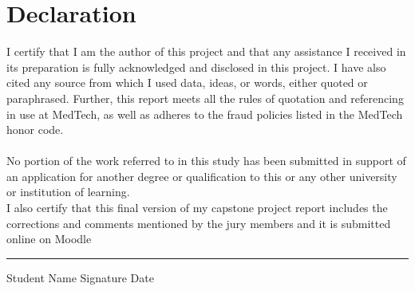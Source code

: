 
\chapter*{Declaration}
\thispagestyle{plain}
\vspace{1.4cm}
\large \noindent
I certify that I am the author of this project and that any assistance I received in its preparation is fully acknowledged and disclosed in this project. I have also cited any source from which I used data, ideas, or words, either quoted or paraphrased. Further, this report meets all the rules of quotation and referencing in use at MedTech, as well as adheres to the fraud policies listed in the MedTech honor code. \\
\\ No portion of the work referred to in this study has been submitted in support of an application for another degree or qualification to this or any other university or institution of learning.
\\I also certify that this final version of my capstone project report includes the corrections and comments mentioned by the jury members and it is submitted online on Moodle \\

\normalsize
\vspace{2cm}



\vspace{0.2cm}
\hrule
\vspace{0.2cm}
\noindent Student Name \hspace{7cm} Signature \hspace{3cm} Date